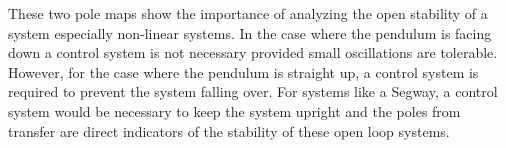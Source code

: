 These two pole maps show the importance of analyzing the open stability of a system especially non-linear systems. In the case where the pendulum is facing down a control system is not necessary provided small oscillations are tolerable. However, for the case where the pendulum is straight up, a control system is required to prevent the system falling over. For systems like a Segway, a control system would be necessary to keep the system upright and the poles from transfer are direct indicators of the stability of these open loop systems.